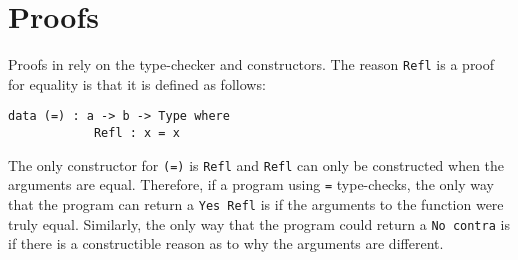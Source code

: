 \section{Proofs}
    Proofs in \Idris rely on the type-checker and constructors. The reason \texttt{Refl} is a proof for equality is that it is defined as follows:
    \begin{lstlisting}[caption={Reflexivity as defined in the \Idris prelude \cite{brady_2017}}]
        data (=) : a -> b -> Type where
            Refl : x = x
    \end{lstlisting}
    The only constructor for \texttt{(=)} is \texttt{Refl} and \texttt{Refl} can only be constructed when the arguments are equal. Therefore, if a program using \texttt{=} type-checks, the only way that the program can return a \texttt{Yes Refl} is if the arguments to the function were truly equal. Similarly, the only way that the program could return a \texttt{No contra} is if there is a constructible reason as to why the arguments are different.

